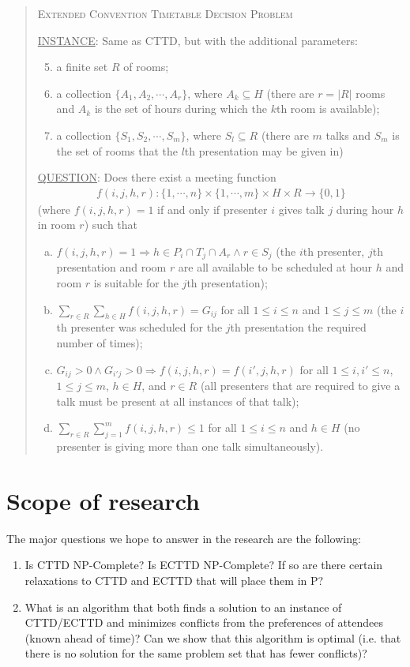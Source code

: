 \documentclass[]{article}
\theoremstyle{definition}
\theoremstyle{remark}
\numberwithin{equation}{section}
\begin{document}
\begin{quote}
	\textsc{Extended Convention Timetable Decision Problem}
	
	\underline{INSTANCE}: Same as CTTD, but with the additional parameters:
		\begin{enumerate}[1.]
			\setcounter{enumi}{4}
			\item a finite set $R$ of rooms;
			\item a collection $\{A_1,A_2,\cdots,A_r\}$, where $A_k \subseteq H$ (there are $r=|R|$ rooms and $A_k$ is the set of hours during which the $k$th room is available);
			\item a collection $\{S_1,S_2,\cdots,S_m\}$, where $S_l \subseteq R$ (there are $m$ talks and $S_m$ is the set of rooms that the $l$th presentation may be given in)
		\end{enumerate}
	\underline{QUESTION}: Does there exist a meeting function 
		\begin{gather*}
			f(i,j,h,r) : \{1,\cdots,n\} \times \{1,\cdots,m\} \times H \times R \rightarrow \{0,1\}
		\end{gather*}
		(where $f(i,j,h,r)=1$ if and only if presenter $i$ gives talk $j$ during hour $h$ in room $r$) such that
		\begin{enumerate}[(a)]
			\item $f(i,j,h,r) = 1 \Rightarrow h \in P_i \cap T_j \cap A_r \land r \in S_j$ (the $i$th presenter, $j$th presentation and room $r$ are all available to be scheduled at hour $h$ and room $r$ is suitable for the $j$th presentation);
			\item $\sum\limits_{r \in R}\sum\limits_{h \in H} f(i,j,h,r) = G_{ij}$ for all $1 \le i \le n$ and $1 \le j \le m$ (the $i$th presenter was scheduled for the $j$th presentation the required number of times);
			\item $G_{ij} > 0 \land G_{i'j} > 0 \Rightarrow f(i,j,h,r)=f(i',j,h,r)$ for all $1 \le i,i' \le n$, $1 \le j \le m$, $h \in H$, and $r \in R$ (all presenters that are required to give a talk must be present at all instances of that talk);
			\item $\sum\limits_{r \in R}\sum\limits_{j=1}^m f(i,j,h,r) \le 1$ for all $1 \le i \le n$ and $h \in H$ (no presenter is giving more than one talk simultaneously).
		\end{enumerate}
\end{quote}

\section{Scope of research}
The major questions we hope to answer in the research are the following:
\begin{enumerate}[(1)]
	\item Is CTTD NP-Complete? Is ECTTD NP-Complete? If so are there certain relaxations to CTTD and ECTTD that will place them in P?
	\item What is an algorithm that both finds a solution to an instance of CTTD/ECTTD and minimizes conflicts from the preferences of attendees (known ahead of time)? Can we show that this algorithm is optimal (i.e. that there is no solution for the same problem set that has fewer conflicts)?
\end{enumerate}
\end{document}
